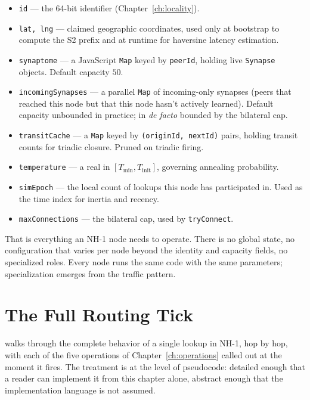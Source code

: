 \documentclass[twoside,nobib]{tufte-book}
\begin{document}
\begin{itemize}\setlength\itemsep{0.2em}
  \item \texttt{id} --- the 64-bit identifier
    (Chapter~\ref{ch:locality}).
  \item \texttt{lat, lng} --- claimed geographic coordinates,
    used only at bootstrap to compute the S2 prefix and at
    runtime for haversine latency estimation.
  \item \texttt{synaptome} --- a JavaScript \texttt{Map} keyed by
    \texttt{peerId}, holding live \texttt{Synapse} objects.
    Default capacity $50$.
  \item \texttt{incomingSynapses} --- a parallel \texttt{Map} of
    incoming-only synapses (peers that reached this node but that
    this node hasn't actively learned). Default capacity unbounded
    in practice; in \emph{de facto} bounded by the bilateral cap.
  \item \texttt{transitCache} --- a \texttt{Map} keyed by
    \texttt{(originId, nextId)} pairs, holding transit counts for
    triadic closure. Pruned on triadic firing.
  \item \texttt{temperature} --- a real in
    $[T_{\min}, T_{\mathrm{init}}]$, governing annealing
    probability.
  \item \texttt{simEpoch} --- the local count of lookups this
    node has participated in. Used as the time index for inertia
    and recency.
  \item \texttt{maxConnections} --- the bilateral cap, used by
    \texttt{tryConnect}.
\end{itemize}

That is everything an NH-1 node needs to operate. There is no
global state, no configuration that varies per node beyond the
identity and capacity fields, no specialized roles. Every node
runs the same code with the same parameters; specialization
emerges from the traffic pattern.


\chapter{The Full Routing Tick}
\label{ch:nh1-routing}

 walks through the complete behavior of
a single lookup in NH-1, hop by hop, with each of the five
operations of Chapter~\ref{ch:operations} called out at the
moment it fires. The treatment is at the level of pseudocode:
detailed enough that a reader can implement it from this chapter
alone, abstract enough that the implementation language is not
assumed.
\end{document}
